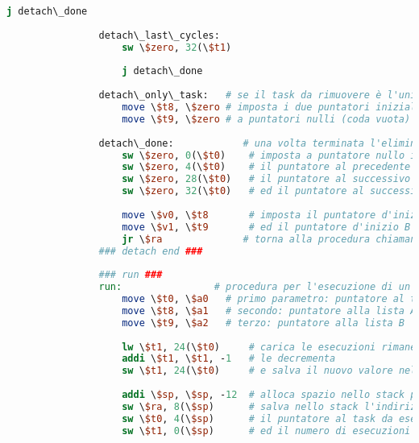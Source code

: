 \begin{center}
\begin{lstlisting}[language=mips, gobble=14, stepnumber=1]
                    j detach\_done
                    
                detach\_last\_cycles:
                    sw \$zero, 32(\$t1)
                
                    j detach\_done
                    
                detach\_only\_task:   # se il task da rimuovere è l'unico presente nelle due code
                    move \$t8, \$zero # imposta i due puntatori iniziali delle liste A e B
                    move \$t9, \$zero # a puntatori nulli (coda vuota)
                    
                detach\_done:            # una volta terminata l'eliminazione dalle due liste
                    sw \$zero, 0(\$t0)    # imposta a puntatore nullo il precedente, nella lista A, del task rimosso
                    sw \$zero, 4(\$t0)    # il puntatore al precedente nella lista B
                    sw \$zero, 28(\$t0)   # il puntatore al successivo nella lista A
                    sw \$zero, 32(\$t0)   # ed il puntatore al successivo nella lista B
                
                    move \$v0, \$t8       # imposta il puntatore d'inizio A come primo valore di ritorno
                    move \$v1, \$t9       # ed il puntatore d'inizio B come secondo valore di ritorno
                    jr \$ra              # torna alla procedura chiamante
                ### detach end ###
                
                ### run ###
                run:                # procedura per l'esecuzione di un task
                    move \$t0, \$a0   # primo parametro: puntatore al task da eseguire
                    move \$t8, \$a1   # secondo: puntatore alla lista A
                    move \$t9, \$a2   # terzo: puntatore alla lista B
                    
                    lw \$t1, 24(\$t0)     # carica le esecuzioni rimanenti del task
                    addi \$t1, \$t1, -1   # le decrementa
                    sw \$t1, 24(\$t0)     # e salva il nuovo valore nel record del task
                    
                    addi \$sp, \$sp, -12  # alloca spazio nello stack per 12 byte (3 word)
                    sw \$ra, 8(\$sp)      # salva nello stack l'indirizzo di ritorno
                    sw \$t0, 4(\$sp)      # il puntatore al task da eseguire
                    sw \$t1, 0(\$sp)      # ed il numero di esecuzioni rimanenti dopo la sua esecuzione
                    

\end{lstlisting}
\end{center}
